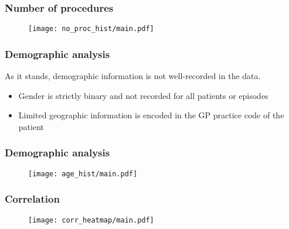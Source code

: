 \begin{frame}
    \frametitle{Number of procedures}

    \begin{figure}
    \texttt{[image: no\_proc\_hist/main.pdf]}
    \end{figure}
\end{frame}

\begin{frame}
    \frametitle{Demographic analysis}

    As it stands, demographic information is not well-recorded in the data.

    \vspace{10pt}
    \begin{itemize}
        \pause%
        \item Gender is strictly binary and not recorded for all patients or
            episodes
        \pause%
        \item Limited geographic information is encoded in the GP practice code
            of the patient
    \end{itemize}
\end{frame}

\begin{frame}
    \frametitle{Demographic analysis}

    \begin{figure}
    \texttt{[image: age\_hist/main.pdf]}
    \end{figure}
\end{frame}

\begin{frame}
    \frametitle{Correlation}

    \vspace{-15pt}
    \begin{figure}
    \texttt{[image: corr\_heatmap/main.pdf]}
    \end{figure}
\end{frame}
